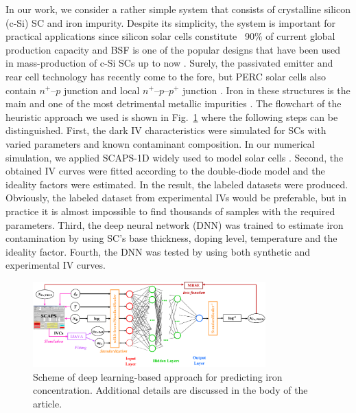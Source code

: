 \documentclass[num-refs]{wiley-article} %
\begin{document}
In our work,
we consider a rather simple system
that consists of crystalline silicon (c-Si) SC  and iron impurity.
Despite its simplicity, the system is important for practical applications
since  silicon solar cells constitute ~90\% of current global production capacity \cite{SCRev2015}
and BSF  is one of  the popular designs that have been used
in mass-production of c-Si SCs up to now \cite{SCRev2020,GreenRew2019}.
Surely, the passivated emitter and rear cell technology has
recently come to the fore, but PERC solar cells also contain $n^+$--$p$ junction
and local $n^+$--$p$--$p^{+}$ junction \cite{GreenRew2019,WilsonRew2020}.
Iron in these structures is the main and one of the most detrimental metallic impurities \cite{ZHU2016192,FeB:Schmidt,IronSC}.
The flowchart of the heuristic approach we used is shown in Fig.~\ref{fig_chem}
where the following steps can be distinguished.
First, the dark IV characteristics were simulated for SCs with varied parameters
and known contaminant composition.
In our numerical simulation,  we applied SCAPS-1D \cite{SCAPS1,SCAPS2}
widely used to model solar cells \cite{SCAPSuseSi4,SCAPSuseSi1,SCAPSuseSi6,SCAPSuse1,SCAPSuse2020,SCAPSuse2017SM}.
Second, the obtained IV curves were fitted according to the double-diode model
and the ideality factors were estimated.
In the result, the labeled datasets were produced.
Obviously, the labeled dataset from experimental IVs  would be preferable,
but in practice it is almost impossible to find thousands of samples
with the required parameters.
Third, the deep neural network (DNN) was trained to estimate iron contamination
by using SC's base thickness, doping level, temperature and the ideality factor.
Fourth, the DNN was tested by using both synthetic and experimental IV curves.

\begin{figure}
\centering
\includegraphics[width=0.8\textwidth]{Fig1}
\caption{Scheme of deep learning-based approach for predicting iron concentration.
Additional details are discussed in the body of the article.
}
\label{fig_chem}
\end{figure}
\end{document}
